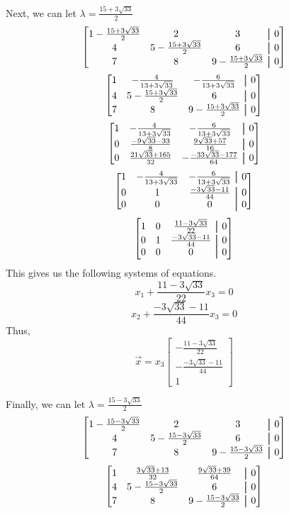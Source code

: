 \documentclass[11pt, letterpaper, twoside]{article}
\newcommand\aug{\fboxsep=-\fboxrule\!\!\!\fbox{\strut}\!\!\!} %
\begin{document}
\begin{enumerate}
Next, we can let \(\lambda=\frac{15+3\sqrt{33}}{2}\)
\[
\begin{bmatrix}
    1-\frac{15+3\sqrt{33}}{2}&2&3&\aug&0\\
    4&5-\frac{15+3\sqrt{33}}{2}&6&\aug&0\\
    7&8&9-\frac{15+3\sqrt{33}}{2}&\aug&0
\end{bmatrix}
\]
\[
\begin{bmatrix}
    1&-\frac{4}{13+3\sqrt{33}}&-\frac{6}{13+3\sqrt{33}}&\aug&0\\
    4&5-\frac{15+3\sqrt{33}}{2}&6&\aug&0\\
    7&8&9-\frac{15+3\sqrt{33}}{2}&\aug&0
\end{bmatrix}
\]
\[
\begin{bmatrix}
    1&-\frac{4}{13+3\sqrt{33}}&-\frac{6}{13+3\sqrt{33}}&\aug&0\\
    0&\frac{-9\sqrt{33}-33}{8}&\frac{9\sqrt{33}+57}{16}&\aug&0\\
    0&\frac{21\sqrt{33}+165}{32}&-\frac{-33\sqrt{33}-177}{64}&\aug&0
\end{bmatrix}
\]
\[
\begin{bmatrix}
    1&-\frac{4}{13+3\sqrt{33}}&-\frac{6}{13+3\sqrt{33}}&\aug&0\\
    0&1&\frac{-3\sqrt{33}-11}{44}&\aug&0\\
    0&0&0&\aug&0
\end{bmatrix}
\]
\[
\begin{bmatrix}
    1&0&\frac{11-3\sqrt{33}}{22}&\aug&0\\
    0&1&\frac{-3\sqrt{33}-11}{44}&\aug&0\\
    0&0&0&\aug&0
\end{bmatrix}
\]
This gives us the following systems of equations.
\[x_1+\frac{11-3\sqrt{33}}{22}x_3=0\]
\[x_2+\frac{-3\sqrt{33}-11}{44}x_3=0\]
Thus, 
\[\vec{x}=x_3\begin{bmatrix}
    -\frac{11-3\sqrt{33}}{22}\\
    -\frac{-3\sqrt{33}-11}{44}\\
    1
\end{bmatrix}\]

Finally, we can let \(\lambda=\frac{15-3\sqrt{33}}{2}\)
\[
\begin{bmatrix}
    1-\frac{15-3\sqrt{33}}{2}&2&3&\aug&0\\
    4&5-\frac{15-3\sqrt{33}}{2}&6&\aug&0\\
    7&8&9-\frac{15-3\sqrt{33}}{2}&\aug&0
\end{bmatrix}
\]
\[
\begin{bmatrix}
    1&\frac{3\sqrt{33}+13}{32}&\frac{9\sqrt{33}+39}{64}&\aug&0\\
    4&5-\frac{15-3\sqrt{33}}{2}&6&\aug&0\\
    7&8&9-\frac{15-3\sqrt{33}}{2}&\aug&0
\end{bmatrix}
\]
\end{enumerate}
\end{document}
